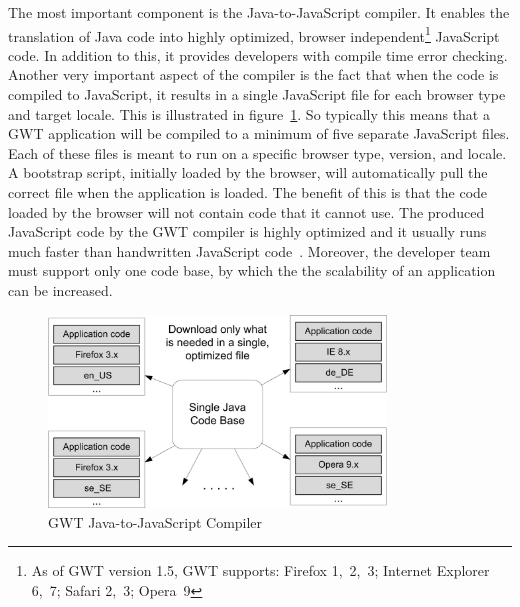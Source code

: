 The most important component is the Java-to-JavaScript compiler. It enables the 
translation of Java code into highly optimized, browser 
independent\footnote{As of GWT version 1.5, GWT supports: 
Firefox 1,~2,~3; Internet Explorer 6,~7; Safari 2,~3; Opera~9}
JavaScript code. 
In addition to this, it provides developers with compile time error checking. 
Another very important
aspect of the compiler is the fact that when the code is compiled to JavaScript,
it results in 
a single JavaScript file for each browser type and target locale. This is illustrated 
in figure~\ref{fig:gwt01}. So typically this means that a GWT application will be compiled to 
a minimum of five separate JavaScript files. Each of these files is meant to run 
on a specific browser type, version, and locale. A bootstrap script, initially 
loaded by the browser, will 
automatically pull the correct file when the
application is loaded. The benefit of this is that the code loaded by the browser 
will not contain code that it cannot use. The produced JavaScript code by the GWT 
compiler is highly optimized and it usually runs much faster than handwritten 
JavaScript code~\cite{wgio1}. Moreover, the developer team must support only
one code base, by which the the scalability of an application can be increased.  

\begin{figure}[h]
	\begin{center}
		\includegraphics[width=0.8\textwidth]{./img/gwt01.png}
		\caption{GWT Java-to-JavaScript Compiler}
		\label{fig:gwt01}
	\end{center}
\end{figure}


